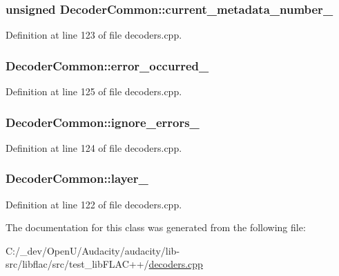 \subsubsection[{\texorpdfstring{current\+\_\+metadata\+\_\+number\+\_\+}{current_metadata_number_}}]{\setlength{\rightskip}{0pt plus 5cm}unsigned Decoder\+Common\+::current\+\_\+metadata\+\_\+number\+\_\+}\hypertarget{class_decoder_common_a69710d20f4bf60a8919c48127c6eb9e8}{}\label{class_decoder_common_a69710d20f4bf60a8919c48127c6eb9e8}


Definition at line 123 of file decoders.\+cpp.

\subsubsection[{\texorpdfstring{error\+\_\+occurred\+\_\+}{error_occurred_}}]{ Decoder\+Common\+::error\+\_\+occurred\+\_\+}\hypertarget{class_decoder_common_a34a7005ec77557f6e65e5977530ba82a}{}\label{class_decoder_common_a34a7005ec77557f6e65e5977530ba82a}


Definition at line 125 of file decoders.\+cpp.

\subsubsection[{\texorpdfstring{ignore\+\_\+errors\+\_\+}{ignore_errors_}}]{ Decoder\+Common\+::ignore\+\_\+errors\+\_\+}\hypertarget{class_decoder_common_a4db3aaf753d1b58d8fe2a79ddbd511fd}{}\label{class_decoder_common_a4db3aaf753d1b58d8fe2a79ddbd511fd}


Definition at line 124 of file decoders.\+cpp.

\subsubsection[{\texorpdfstring{layer\+\_\+}{layer_}}]{ Decoder\+Common\+::layer\+\_\+}\hypertarget{class_decoder_common_ae5c9fd9e922fb5b9ddac0cd29a1ec4d5}{}\label{class_decoder_common_ae5c9fd9e922fb5b9ddac0cd29a1ec4d5}


Definition at line 122 of file decoders.\+cpp.



The documentation for this class was generated from the following file\+:\begin{DoxyCompactItemize}
\item 
C\+:/\+\_\+dev/\+Open\+U/\+Audacity/audacity/lib-\/src/libflac/src/test\+\_\+lib\+F\+L\+A\+C++/\hyperlink{decoders_8cpp}{decoders.\+cpp}\end{DoxyCompactItemize}
